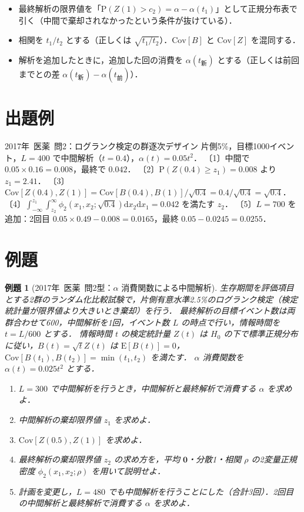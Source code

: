 \documentclass[a4paper,11pt,openany]{ltjsbook}
\newtheorem{reidai}{例題}[chapter]
\newcommand{\kakomon}[2]{\mbox{#1年 医薬 問#2}}
\newcommand{\E}{\mathrm{E}}
\newcommand{\Cov}{\mathrm{Cov}}
\newcommand{\Prob}{\mathrm{P}}
\newcommand{\dd}{\mathrm{d}}
\begin{document}
\begin{warnbox}
\begin{itemize}
\item 最終解析の限界値を「$\Prob(Z(1)>c_2)=\alpha-\alpha(t_1)$」として正規分布表で引く（中間で棄却されなかったという条件が抜けている）．
\item 相関を $t_1/t_2$ とする（正しくは $\sqrt{t_1/t_2}$）．$\Cov[B]$ と $\Cov[Z]$ を混同する．
\item 解析を追加したときに，追加した回の消費を $\alpha(t_{\text{新}})$ とする（正しくは前回までとの差 $\alpha(t_{\text{新}})-\alpha(t_{\text{前}})$）．
\end{itemize}
\end{warnbox}

\section{出題例}\label{sec:m09-shutsudai}
\begin{shutsudai}{\kakomon{2017}{2}：ログランク検定の群逐次デザイン}
片側5\%，目標1000イベント，$L=400$ で中間解析（$t=0.4$），$\alpha(t)=0.05t^2$．
〔1〕中間で $0.05\times0.16=0.008$，最終で $0.042$．
〔2〕$\Prob(Z(0.4)\ge z_1)=0.008$ より $z_1=2.41$．
〔3〕$\Cov[Z(0.4),Z(1)]=\Cov[B(0.4),B(1)]/\sqrt{0.4}=0.4/\sqrt{0.4}=\sqrt{0.4}$．
〔4〕$\int_{-\infty}^{z_1}\int_{z_2}^{\infty}\phi_2(x_1,x_2;\sqrt{0.4})\dd x_2\dd x_1=0.042$ を満たす $z_2$．
〔5〕$L=700$ を追加：2回目 $0.05\times0.49-0.008=0.0165$，最終 $0.05-0.0245=0.0255$．
\end{shutsudai}

\section{例題}\label{sec:m09-reidai}
\begin{reidai}[\kakomon{2017}{2}型：$\alpha$ 消費関数による中間解析]\label{reidai:m09-1}
生存期間を評価項目とする2群のランダム化比較試験で，片側有意水準2.5\%のログランク検定（検定統計量が限界値より大きいとき棄却）を行う．
最終解析の目標イベント数は両群合わせて600，中間解析を1回，イベント数 $L$ の時点で行い，情報時間を $t=L/600$ とする．
情報時間 $t$ の検定統計量 $Z(t)$ は $H_0$ の下で標準正規分布に従い，$B(t)=\sqrt tZ(t)$ は $\E[B(t)]=0$，$\Cov[B(t_1),B(t_2)]=\min(t_1,t_2)$ を満たす．
$\alpha$ 消費関数を $\alpha(t)=0.025t^2$ とする．
\begin{enumerate}[label=〔\arabic*〕]
\item $L=300$ で中間解析を行うとき，中間解析と最終解析で消費する $\alpha$ を求めよ．
\item 中間解析の棄却限界値 $z_1$ を求めよ．
\item $\Cov[Z(0.5),Z(1)]$ を求めよ．
\item 最終解析の棄却限界値 $z_2$ の求め方を，平均 $\bm 0$・分散1・相関 $\rho$ の2変量正規密度 $\phi_2(x_1,x_2;\rho)$ を用いて説明せよ．
\item 計画を変更し，$L=480$ でも中間解析を行うことにした（合計3回）．2回目の中間解析と最終解析で消費する $\alpha$ を求めよ．
\end{enumerate}
\end{reidai}
\end{document}
